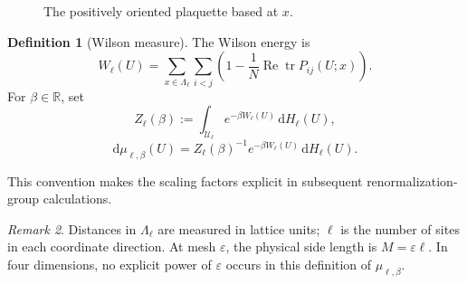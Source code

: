 \documentclass[10pt,reqno]{amsart}
\theoremstyle{definition}
\newtheorem{definition}{Definition}[section]
\theoremstyle{remark}
\newtheorem{remark}[definition]{Remark}
\numberwithin{equation}{section}
\numberwithin{figure}{section}
\newcommand{\dd}{\mathrm d}
\newcommand{\R}{\mathbb R}
\newcommand{\e}{\varepsilon}
\DeclareMathOperator{\tr}{tr}
\begin{document}
\begin{figure}[htbp]
\centering
{}
\caption{The positively oriented plaquette based at $x$.}
\label{fig:plaquette}
\end{figure}

\begin{definition}[Wilson measure]
The Wilson energy is
\begin{equation}\label{eq:wilson-energy}
W_\ell(U)=\sum_{x\in\Lambda_\ell}\sum_{i<j}
 \left(1-\frac1N\operatorname{Re}\tr P_{ij}(U;x)\right).
\end{equation}
For $\beta\in\R$, set
\begin{equation}\label{eq:partition-function}
Z_\ell(\beta):=\int_{\mathcal U_\ell}e^{-\beta W_\ell(U)}\,\dd H_\ell(U),
\end{equation}
\begin{equation}\label{eq:wilson-measure}
\dd\mu_{\ell,\beta}(U)
 =Z_\ell(\beta)^{-1}e^{-\beta W_\ell(U)}\,\dd H_\ell(U).
\end{equation}
\end{definition}

This convention makes the scaling factors explicit in subsequent renormalization-group calculations.

\begin{remark} Distances in $\Lambda_\ell$ are measured in lattice units; $\ell$ is the number of sites in each coordinate direction.
At mesh $\e$, the physical side length is $M=\e\ell$.
In four dimensions, no explicit power of $\e$ occurs in this definition of $\mu_{\ell,\beta}$.

\end{remark}
\end{document}
